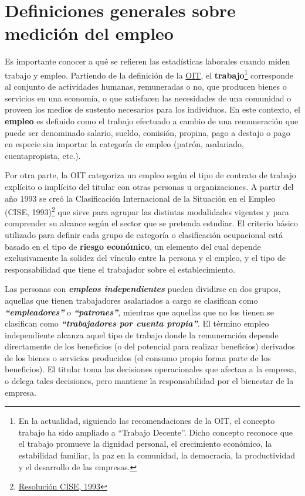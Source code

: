 \documentclass[
  openany]{book}
\begin{document}
\hypertarget{definiciones-generales-sobre-mediciuxf3n-del-empleo}{%
\section{Definiciones generales sobre medición del empleo}\label{definiciones-generales-sobre-mediciuxf3n-del-empleo}}

Es importante conocer a qué se refieren las estadísticas laborales cuando miden trabajo y empleo. Partiendo de la definición de la \href{https://www.ilo.org/global/lang--es/index.htm}{OIT}, el \textbf{trabajo}\footnote{En la actualidad, siguiendo las recomendaciones de la OIT, el concepto trabajo ha sido ampliado a ``Trabajo Decente''. Dicho concepto reconoce que el trabajo promueve la dignidad personal, el crecimiento económico, la estabilidad familiar, la paz en la comunidad, la democracia, la productividad y el desarrollo de las empresas.} corresponde al conjunto de actividades humanas, remuneradas o no, que producen bienes o servicios en una economía, o que satisfacen las necesidades de una comunidad o proveen los medios de sustento necesarios para los individuos. En este contexto, el \textbf{empleo} es definido como el trabajo efectuado a cambio de una remuneración que puede ser denominado salario, sueldo, comisión, propina, pago a destajo o pago en especie sin importar la categoría de empleo (patrón, asalariado, cuentapropista, etc.).

Por otra parte, la OIT categoriza un empleo según el tipo de contrato de trabajo explícito o implícito del titular con otras personas u organizaciones. A partir del año 1993 se creó la Clasificación Internacional de la Situación en el Empleo (CISE, 1993)\footnote{\href{http://www.ilo.org/public/spanish/bureau/stat/download/res/icse.pdf}{Resolución CISE, 1993}} que sirve para agrupar las distintas modalidades vigentes y para comprender su alcance según el sector que se pretenda estudiar. El criterio básico utilizado para definir cada grupo de categoría o clasificación ocupacional está basado en el tipo de \textbf{riesgo económico}, un elemento del cual depende exclusivamente la solidez del vínculo entre la persona y el empleo, y el tipo de responsabilidad que tiene el trabajador sobre el establecimiento.

Las personas con \textbf{\emph{empleos independientes}} pueden dividirse en dos grupos, aquellas que tienen trabajadores asalariados a cargo se clasifican como \textbf{\emph{``empleadores''}} o \textbf{\emph{``patrones''}}, mientras que aquellas que no los tienen se clasifican como \textbf{\emph{``trabajadores por cuenta propia''}}. El término empleo independiente alcanza aquel tipo de trabajo donde la remuneración depende directamente de los beneficios (o del potencial para realizar beneficios) derivados de los bienes o servicios producidos (el consumo propio forma parte de los beneficios). El titular toma las decisiones operacionales que afectan a la empresa, o delega tales decisiones, pero mantiene la responsabilidad por el bienestar de la empresa.
\end{document}

